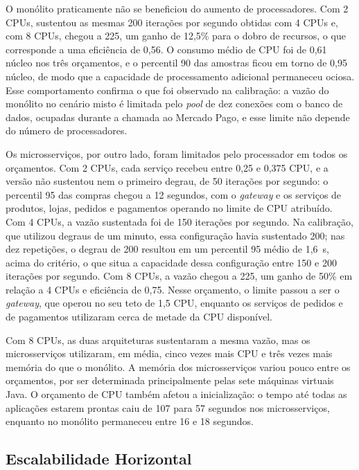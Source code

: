 O monólito praticamente não se beneficiou do aumento de processadores. Com 2 CPUs, sustentou as
mesmas 200 iterações por segundo obtidas com 4 CPUs e, com 8 CPUs, chegou a 225, um ganho de
12,5\% para o dobro de recursos, o que corresponde a uma eficiência de 0,56. O consumo médio de
CPU foi de 0,61 núcleo nos três orçamentos, e o percentil 90 das amostras ficou em torno de
0,95 núcleo, de modo que a capacidade de processamento adicional permaneceu ociosa. Esse
comportamento confirma o que foi observado na calibração: a vazão do monólito no cenário misto é
limitada pelo \textit{pool} de dez conexões com o banco de dados, ocupadas durante a chamada ao
Mercado Pago, e esse limite não depende do número de processadores.

Os microsserviços, por outro lado, foram limitados pelo processador em todos os orçamentos. Com
2 CPUs, cada serviço recebeu entre 0,25 e 0,375 CPU, e a versão não sustentou nem o primeiro
degrau, de 50 iterações por segundo: o percentil 95 das compras chegou a 12 segundos, com o
\textit{gateway} e os serviços de produtos, lojas, pedidos e pagamentos operando no limite de CPU
atribuído. Com 4 CPUs, a vazão sustentada foi de 150 iterações por segundo. Na calibração, que
utilizou degraus de um minuto, essa configuração havia sustentado 200; nas dez repetições, o
degrau de 200 resultou em um percentil 95 médio de 1,6~s, acima do critério, o que situa a
capacidade dessa configuração entre 150 e 200 iterações por segundo. Com 8 CPUs, a vazão chegou a
225, um ganho de 50\% em relação a 4 CPUs e eficiência de 0,75. Nesse orçamento, o limite passou a
ser o \textit{gateway}, que operou no seu teto de 1,5 CPU, enquanto os serviços de pedidos e de
pagamentos utilizaram cerca de metade da CPU disponível.

Com 8 CPUs, as duas arquiteturas sustentaram a mesma vazão, mas os microsserviços utilizaram, em
média, cinco vezes mais CPU e três vezes mais memória do que o monólito. A memória dos
microsserviços variou pouco entre os orçamentos, por ser determinada principalmente pelas sete
máquinas virtuais Java. O orçamento de CPU também afetou a inicialização: o tempo até todas as
aplicações estarem prontas caiu de 107 para 57 segundos nos microsserviços, enquanto no monólito
permaneceu entre 16 e 18 segundos.

\subsection{Escalabilidade Horizontal}

